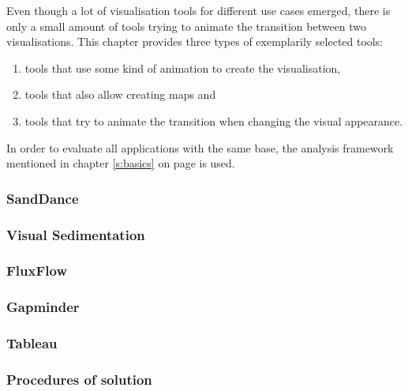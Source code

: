 Even though a lot of visualisation tools for different use cases emerged, there is only a small amount of tools trying to animate the transition between two visualisations. This chapter provides three types of exemplarily selected tools:

\begin{enumerate}
\item tools that use some kind of animation to create the visualisation,
\item tools that also allow creating maps and
\item tools that try to animate the transition when changing the visual appearance.
\end{enumerate}

In order to evaluate all applications with the same base, the analysis framework mentioned in chapter \ref{s:basics} on page \pageref{s:basics} is used.

\subsubsection{SandDance}


\subsubsection{Visual Sedimentation}


\subsubsection{FluxFlow}


\subsubsection{Gapminder}


\subsubsection{Tableau}


\subsubsection{Procedures of solution}
